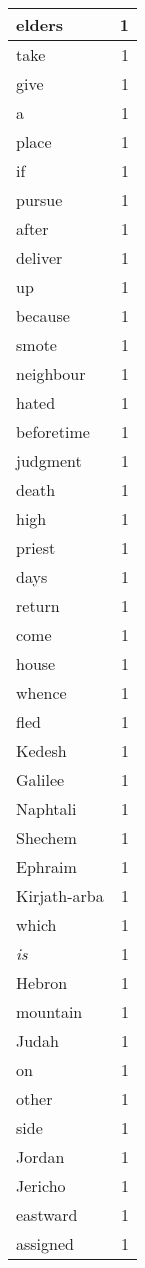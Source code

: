 \begin{center}
\begin{longtable}{l|r}
elders & 1\\ \hline 
take & 1\\ \hline 
give & 1\\ \hline 
a & 1\\ \hline 
place & 1\\ \hline 
if & 1\\ \hline 
pursue & 1\\ \hline 
after & 1\\ \hline 
deliver & 1\\ \hline 
up & 1\\ \hline 
because & 1\\ \hline 
smote & 1\\ \hline 
neighbour & 1\\ \hline 
hated & 1\\ \hline 
beforetime & 1\\ \hline 
judgment & 1\\ \hline 
death & 1\\ \hline 
high & 1\\ \hline 
priest & 1\\ \hline 
days & 1\\ \hline 
return & 1\\ \hline 
come & 1\\ \hline 
house & 1\\ \hline 
whence & 1\\ \hline 
fled & 1\\ \hline 
Kedesh & 1\\ \hline 
Galilee & 1\\ \hline 
Naphtali & 1\\ \hline 
Shechem & 1\\ \hline 
Ephraim & 1\\ \hline 
Kirjath-arba & 1\\ \hline 
which & 1\\ \hline 
\emph{is} & 1\\ \hline 
Hebron & 1\\ \hline 
mountain & 1\\ \hline 
Judah & 1\\ \hline 
on & 1\\ \hline 
other & 1\\ \hline 
side & 1\\ \hline 
Jordan & 1\\ \hline 
Jericho & 1\\ \hline 
eastward & 1\\ \hline 
assigned & 1\\ \hline 

\end{longtable}
\end{center}
